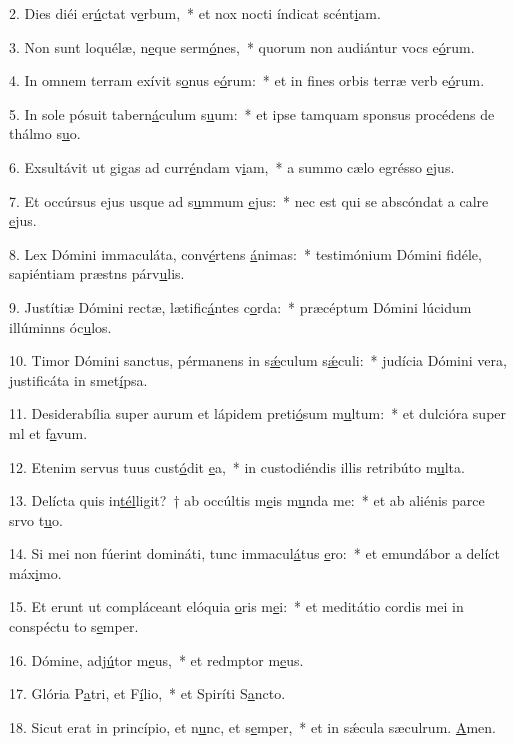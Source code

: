 2. Dies diéi er\uline{ú}ctat v\uline{e}rbum,~* et nox nocti índicat scént\uline{i}am.\par 
3. Non sunt loquélæ, n\uline{e}que serm\uline{ó}nes,~* quorum non audiántur vocs e\uline{ó}rum.\par 
4. In omnem terram exívit s\uline{o}nus e\uline{ó}rum:~* et in fines orbis terræ verb e\uline{ó}rum.\par 
5. In sole pósuit tabern\uline{á}culum s\uline{u}um:~* et ipse tamquam sponsus procédens de thálmo s\uline{u}o.\par 
6. Exsultávit ut gigas ad curr\uline{é}ndam v\uline{i}am,~* a summo cælo egrésso \uline{e}jus.\par 
7. Et occúrsus ejus usque ad s\uline{u}mmum \uline{e}jus:~* nec est qui se abscóndat a calre \uline{e}jus.\par 
8. Lex Dómini immaculáta, conv\uline{é}rtens \uline{á}nimas:~* testimónium Dómini fidéle, sapiéntiam præstns párv\uline{u}lis.\par 
9. Justítiæ Dómini rectæ, lætific\uline{á}ntes c\uline{o}rda:~* præcéptum Dómini lúcidum illúminns óc\uline{u}los.\par 
10. Timor Dómini sanctus, pérmanens in s\uline{ǽ}culum s\uline{ǽ}culi:~* judícia Dómini vera, justificáta in smet\uline{í}psa.\par 
11. Desiderabília super aurum et lápidem preti\uline{ó}sum m\uline{u}ltum:~* et dulcióra super ml et f\uline{a}vum.\par 
12. Etenim servus tuus cust\uline{ó}dit \uline{e}a,~* in custodiéndis illis retribúto m\uline{u}lta.\par 
13. Delícta quis in\uline{tél}ligit?~† ab occúltis m\uline{e}is m\uline{u}nda me:~* et ab aliénis parce srvo t\uline{u}o.\par 
14. Si mei non fúerint domináti, tunc immacul\uline{á}tus \uline{e}ro:~* et emundábor a delíct máx\uline{i}mo.\par 
15. Et erunt ut compláceant elóquia \uline{o}ris m\uline{e}i:~* et meditátio cordis mei in conspéctu to s\uline{e}mper.\par 
16. Dómine, adj\uline{ú}tor m\uline{e}us,~* et redmptor m\uline{e}us.\par 
17. Glória P\uline{a}tri, et F\uline{í}lio,~* et Spiríti S\uline{a}ncto.\par 
18. Sicut erat in princípio, et n\uline{u}nc, et s\uline{e}mper,~* et in sǽcula sæculrum. \uline{A}men.\par 

